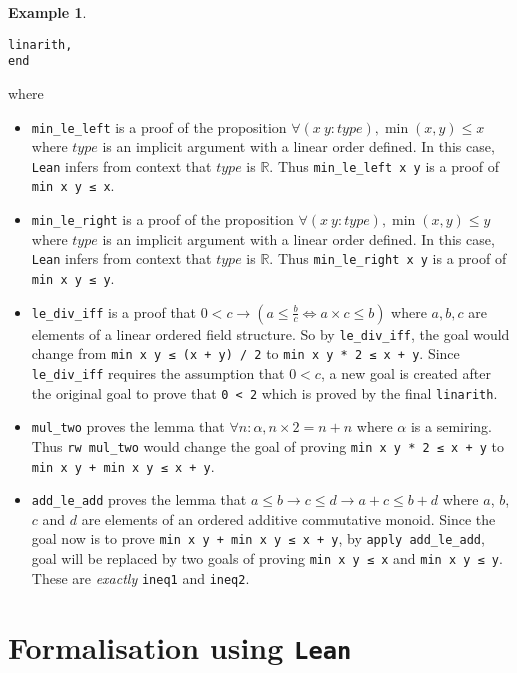 \documentclass{report}
\theoremstyle{definition}
\newtheorem{example}{Example}
\theoremstyle{plain}
\begin{document}
\begin{example}
\begin{verbatim}
linarith,
end
\end{verbatim}
where
\begin{itemize}
\item \texttt{min_le_left} is a proof of the proposition $\forall (x\ y : type), \min(x, y) \le x$ where $type$ is an implicit argument with a linear order defined. In this case, {\tt Lean} infers from context that $type$ is $\mathbb R$. Thus \texttt{min_le_left x y} is a proof of \texttt{min x y ≤ x}.
\item \texttt{min_le_right} is a proof of the proposition $\forall (x\ y : type), \min(x, y) \le y$ where $type$ is an implicit argument with a linear order defined. In this case, {\tt Lean} infers from context that $type$ is $\mathbb R$. Thus \texttt{min_le_right x y} is a proof of \texttt{min x y ≤ y}.
\item \texttt{le_div_iff} is a proof that $0 < c \to (a \le \frac{b}{c} \iff a\times c \le b)$ where $a,b,c$ are elements of a linear ordered field structure. So by \texttt{le_div_iff}, the goal would change from {\tt min x y ≤ (x + y) / 2} to {\tt min x y * 2 ≤ x + y}. Since \texttt{le_div_iff} requires the assumption that $0<c$, a new goal is created after the original goal to prove that {\tt 0 < 2} which is proved by the final \texttt{linarith}.
\item \texttt{mul_two} proves the lemma that $\forall n:\alpha, n\times 2 = n+n$ where $\alpha$ is a semiring. Thus {\tt rw mul\_two} would change the goal of proving {\tt min x y * 2 ≤ x + y} to {\tt min x y + min x y ≤ x + y}.
\item \texttt{add_le_add} proves the lemma that $a \le b \to c \le d \to a + c \le b + d$ where $a$, $b$, $c$ and $d$ are elements of an ordered additive commutative monoid. Since the goal now is to prove {\tt min x y + min x y ≤ x + y}, by {\tt apply add\_le\_add}, goal will be replaced by two goals of proving {\tt min x y ≤ x} and {\tt min x y ≤ y}. These are {\it exactly} {\tt ineq1} and {\tt ineq2}.
\end{itemize}
\end{example}

\chapter{Formalisation using {\tt Lean}}\label{fmlsn}

\end{document}
